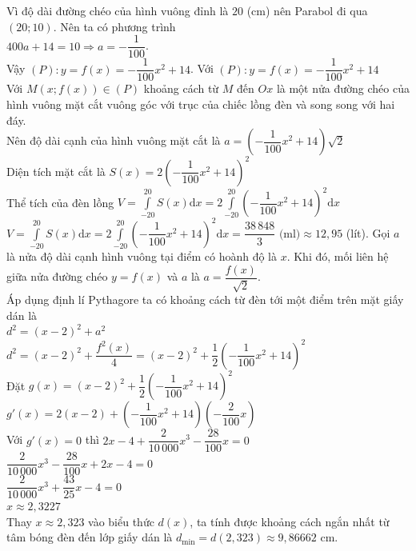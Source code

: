 \begin{ex}
{\begin{itemchoice}
			Vì độ dài đường chéo của hình vuông đỉnh là $20$ (cm) nên Parabol đi qua $(20; 10)$. Nên ta có phương trình\\
			$400a + 14 = 10 \Rightarrow a = -\dfrac{1}{100}$.\\
			Vậy $(P) \colon y = f(x) = -\dfrac{1}{100}x^2 + 14$.
			\itemch 
			Với $(P) \colon y = f(x) = -\dfrac{1}{100}x^2 + 14$\\
			Với $M(x; f(x)) \in (P)$ khoảng cách từ $M$ đến $Ox$ là một nửa đường chéo của hình vuông mặt cắt vuông góc với trục của chiếc lồng đèn và song song với hai đáy.\\
			Nên độ dài cạnh của hình vuông mặt cắt là $a = \left(-\dfrac{1}{100}x^2 + 14\right)\sqrt{2}$\\
			Diện tích mặt cắt là $S(x) = 2\left(-\dfrac{1}{100}x^2 + 14\right)^2$\\
			Thể tích của đèn lồng $V = \displaystyle\int\limits_{-20}^{20} S(x)\text{d}x = 2 \displaystyle\int\limits_{-20}^{20} \left(-\dfrac{1}{100}x^2 + 14\right)^2 \text{d}x$\\
			$V = \displaystyle\int\limits_{-20}^{20} S(x)\text{d}x = 2 \displaystyle\int\limits_{-20}^{20} \left(-\dfrac{1}{100}x^2 + 14\right)^2 \text{d}x = \dfrac{38\,848}{3} \text{ (ml)} \approx 12{,}95$ (lít).
			\itemch 
			Gọi $a$ là nửa độ dài cạnh hình vuông tại điểm có hoành độ là $x$. Khi đó, mối liên hệ giữa nửa đường chéo $y = f(x)$ và $a$ là $a = \dfrac{f(x)}{\sqrt{2}}$.\\
			Áp dụng định lí Pythagore ta có khoảng cách từ đèn tới một điểm trên mặt giấy dán là\\
			$d^2 = (x-2)^2 + a^2$\\
			$d^2 = (x-2)^2 + \dfrac{f^2(x)}{4} = (x-2)^2 + \dfrac{1}{2}\left(-\dfrac{1}{100}x^2 + 14\right)^2$\\
			Đặt $g(x) = (x-2)^2 + \dfrac{1}{2}\left(-\dfrac{1}{100}x^2 + 14\right)^2$\\
			$g'(x) = 2(x-2) + \left(-\dfrac{1}{100}x^2 + 14\right)\left(-\dfrac{2}{100}x\right)$\\
			Với $g'(x) = 0$ thì $2x - 4 + \dfrac{2}{10\,000}x^3 - \dfrac{28}{100}x = 0$\\
			$\dfrac{2}{10\,000}x^3 - \dfrac{28}{100}x + 2x - 4 = 0$\\
			$\dfrac{2}{10\,000}x^3 + \dfrac{43}{25}x - 4 = 0$\\
			$x \approx 2{,}3227$\\
			Thay $x \approx 2{,}323$ vào biểu thức $d(x)$, ta tính được khoảng cách ngắn nhất từ tâm bóng đèn đến lớp giấy dán là $d_{\min} = d(2{,}323) \approx 9{,}86662$ cm.\\

\end{itemchoice}}
\end{ex}
